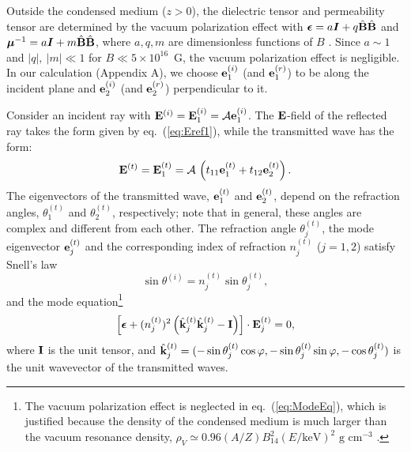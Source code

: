 \documentclass{emulateapj}
\newcommand{\be}{\begin{equation}}
\newcommand{\ee}{\end{equation}}
\newcommand{\cA}{{\cal A}}
\newcommand{\beps}{{\mbox{\boldmath $\epsilon$}}}
\newcommand{\bmu}{{\mbox{\boldmath $\mu$}}}
\newcommand{\bB}{{\bf B}}
\newcommand{\bE}{{\bf E}}
\newcommand{\bfe}{{\bf e}}
\newcommand{\bk}{{\bf k}}
\newcommand{\hatx}{{\bf\hat x}}
\newcommand{\haty}{{\bf\hat y}}
\newcommand{\hatz}{{\bf\hat z}}
\begin{document}
Outside the condensed medium ($z>0$), the dielectric tensor
and permeability tensor are determined by the vacuum polarization effect
with $\beps=a\mbox{\boldmath $I$}+q\hat\bB\hat\bB$ and $\bmu^{-1}=a\mbox{\boldmath $I$}+m\hat\bB\hat\bB$,
where $a,q,m$ are dimensionless
functions of $B$ \citep[see][and references therein]{HoLai03}.
Since $a\sim 1$ and $|q|,~|m|\ll 1$ for $B\ll 5\times 10^{16}$~G, 
the vacuum polarization effect is negligible. In our calculation
(Appendix A), we choose ${\bf e}^{(i)}_1$ (and ${\bf e}^{(r)}_1$)
to be along the incident plane and ${\bf e}^{(i)}_2$ 
(and ${\bf e}^{(r)}_2$) perpendicular to it.

Consider an incident ray with $\bE^{(i)}=
\bE_1^{(i)}=\cA{\bf e}_1^{(i)}$. The 
$\bE$-field of the reflected ray takes the form given by eq.~(\ref{eq:Eref1}),
while the transmitted wave has the form:
\be
\bE^{(t)}=\bE_1^{(t)}=\cA\,\left(t_{11}\bfe_1^{(t)}+t_{12}\bfe_2^{(t)}
\right).
\ee
The eigenvectors of the transmitted wave, $\bfe_1^{(t)}$ and $\bfe_2^{(t)}$,
depend on the refraction angles, $\theta_1^{(t)}$ and $\theta_2^{(t)}$,
respectively; note that in general, these angles are complex and
different from each other. The refraction angle $\theta_j^{(t)}$,
the mode eigenvector $\bfe_j^{(t)}$ and the corresponding index of refraction 
$n_j^{(t)}$ ($j=1,2$) satisfy Snell's law
\be
\label{eq:Snell}
\sin\theta^{(i)}=n_j^{(t)}\sin\theta_j^{(t)},
\ee
and the mode equation\footnote{The vacuum polarization effect is neglected 
in eq.~(\ref{eq:ModeEq}), which is justified because
the density of the condensed medium is much larger than the vacuum resonance density, 
$\rho_V\simeq 0.96 (A/Z) B_{14}^2 (E/\mathrm{keV})^2 \mbox{ g cm}^{-3}$ 
\citep[see][]{LaiHo02}.}
\be
\label{eq:ModeEq}
\left[\beps+(n_j^{(t)})^2
\left(\hat\bk^{(t)}_j\hat\bk^{(t)}_j-{\bf I}\right)\right]\cdot\bE_j^{(t)}=0,
\ee
where ${\bf I}$ is the unit tensor,
and $\hat\bk^{(t)}_j=(-\sin\theta_j^{(t)}\cos\varphi, 
-\sin\theta_j^{(t)}\sin\varphi,-\cos\theta_j^{(t)})$ is the unit wavevector of the transmitted waves.
\end{document}
